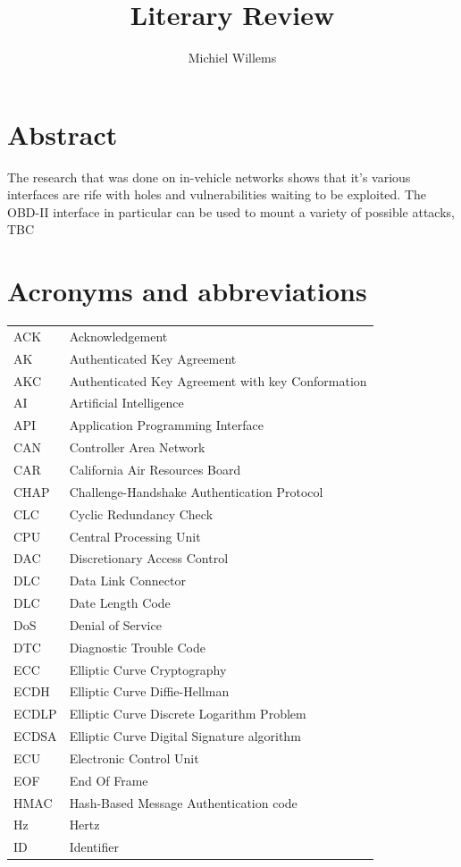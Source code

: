 \documentclass[11pt]{article}
\title{Literary Review}
\author{Michiel Willems}
\begin{document}
	
\section{Abstract}
The research that was done on in-vehicle networks shows that it's various interfaces are rife with holes and vulnerabilities waiting to be exploited. The OBD-II interface in particular can be used to mount a variety of possible attacks, TBC
	


\section{Acronyms and abbreviations}
\begin{tabular}{ l l }
	ACK & Acknowledgement \\
	AK & Authenticated Key Agreement \\
	AKC & Authenticated Key Agreement with key Conformation \\
	AI & Artificial Intelligence \\
	API & Application Programming Interface \\
	CAN & Controller Area Network \\
	CAR & California Air Resources Board \\
	CHAP & Challenge-Handshake Authentication Protocol \\
	CLC & Cyclic Redundancy Check \\
	CPU & Central Processing Unit \\
	DAC & Discretionary Access Control \\
	DLC & Data Link Connector \\
	DLC & Date Length Code \\
	DoS & Denial of Service \\
	DTC & Diagnostic Trouble Code \\
	ECC & Elliptic Curve Cryptography \\
	ECDH & Elliptic Curve Diffie-Hellman \\
	ECDLP & Elliptic Curve Discrete Logarithm Problem \\
	ECDSA & Elliptic Curve Digital Signature algorithm \\
	ECU & Electronic Control Unit \\
	EOF & End Of Frame \\
	HMAC & Hash-Based Message Authentication code \\
	Hz & Hertz \\
	ID & Identifier \\

\end{tabular}
\end{document}
